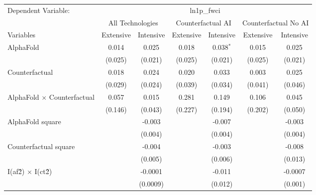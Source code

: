 \begingroup
\centering
\begin{tabular}{lcccccc}
   \tabularnewline \midrule \midrule
   Dependent Variable: & \multicolumn{6}{c}{ln1p\_fwci}\\
 & \multicolumn{2}{c}{All Technologies} & \multicolumn{2}{c}{Counterfactual AI} & \multicolumn{2}{c}{Counterfactual No AI} \\
\cmidrule(lr){1-1}\cmidrule(lr){2-3} \cmidrule(lr){4-5} \cmidrule(lr){6-7}
Variables & \multicolumn{1}{c}{Extensive} & \multicolumn{1}{c}{Intensive} & \multicolumn{1}{c}{Extensive} & \multicolumn{1}{c}{Intensive} & \multicolumn{1}{c}{Extensive} & \multicolumn{1}{c}{Intensive} \\
\cmidrule(lr){1-1}\cmidrule(lr){2-2} \cmidrule(lr){3-3} \cmidrule(lr){4-4} \cmidrule(lr){5-5} \cmidrule(lr){6-6} \cmidrule(lr){7-7}
   AlphaFold                          & 0.014   & 0.025    & 0.018   & 0.038$^{*}$ & 0.015   & 0.025\\   
                                      & (0.025) & (0.021)  & (0.025) & (0.021)     & (0.025) & (0.021)\\   
   Counterfactual                     & 0.018   & 0.024    & 0.020   & 0.033       & 0.003   & 0.025\\   
                                      & (0.029) & (0.024)  & (0.039) & (0.034)     & (0.041) & (0.046)\\   
   AlphaFold $\times$ Counterfactual  & 0.057   & 0.015    & 0.281   & 0.149       & 0.106   & 0.045\\   
                                      & (0.146) & (0.043)  & (0.227) & (0.194)     & (0.202) & (0.050)\\   
   AlphaFold square                   &         & -0.003   &         & -0.007      &         & -0.003\\   
                                      &         & (0.004)  &         & (0.004)     &         & (0.004)\\   
   Counterfactual square              &         & -0.004   &         & -0.003      &         & -0.008\\   
                                      &         & (0.005)  &         & (0.006)     &         & (0.013)\\   
   I(af\^2) $\times$ I(ct\^2)         &         & -0.0001  &         & -0.011      &         & -0.0007\\   
                                      &         & (0.0009) &         & (0.012)     &         & (0.001)\\   

\end{tabular}
